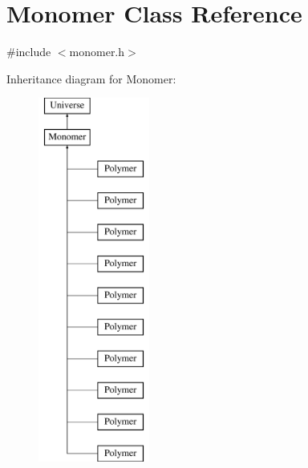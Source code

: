 \hypertarget{classMonomer}{}\section{Monomer Class Reference}
\label{classMonomer}


{\ttfamily \#include $<$monomer.\+h$>$}

Inheritance diagram for Monomer\+:\begin{figure}[H]
\begin{center}
\leavevmode
\includegraphics[height=12.000000cm]{classMonomer}
\end{center}
\end{figure}
